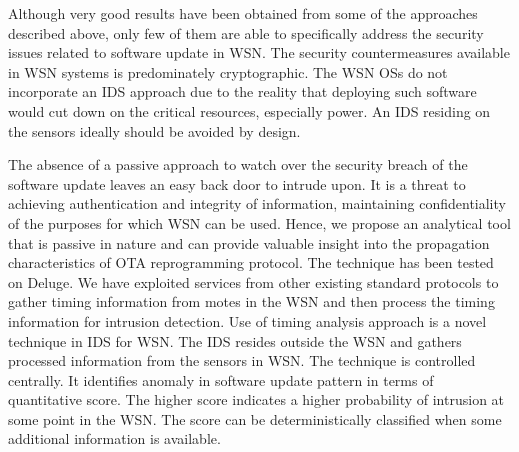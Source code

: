 \documentclass[conference]{IEEEtran}
\newcommand{\notedme}[1]{\raisebox{0pt}[0pt][0pt]{\pdfcomment[open=true,color=blue]{#1}}}
\begin{document}
Although very good results have been obtained from some of the approaches described above, only few of them are able to specifically address the security issues related to software update in WSN.
The security countermeasures available in WSN systems is predominately cryptographic.
The WSN OSs do not incorporate an IDS approach due to the reality that deploying such software would cut down on the critical resources, especially power.
An IDS residing on the sensors ideally should be avoided by design.

The absence of a passive approach to watch over the security breach of the software update leaves an easy back door  to intrude upon.
It is a threat to achieving authentication and integrity of information, maintaining confidentiality of the purposes for which WSN can be used.
Hence, we propose an analytical tool that is passive in nature and can provide valuable insight into the propagation characteristics of OTA reprogramming protocol. 
The technique has been tested on Deluge.
We have exploited services from other existing standard protocols to gather timing information from motes in  the WSN and then process the timing information for intrusion detection.
Use of timing analysis approach is a novel technique in IDS for WSN.
The IDS  resides outside the WSN and gathers processed information from the sensors in WSN.
The technique is controlled  centrally.
It  identifies anomaly in software update pattern in terms of quantitative score. 
The higher score indicates a higher probability of intrusion at some point in the WSN. 
The score can be deterministically classified when some additional information is available.
\end{document}
